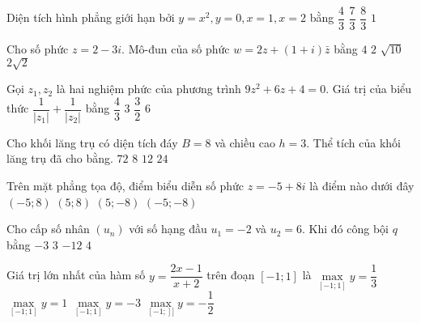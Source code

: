 \begin{ex}%
Diện tích hình phẳng giới hạn bởi $y=x^2, y=0, x=1, x=2$ bằng
\choice
{$\dfrac{4}{3}$}
{\True $\dfrac{7}{3}$}
{$\dfrac{8}{3}$}
{$1$}

\end{ex}
\begin{ex}%
Cho số phức $z=2-3 i$. Mô-đun của số phức $w=2 z+(1+i) \bar{z}$ bằng
\choice
{$4$}
{$2$}
{\True $\sqrt{10}$}
{$2\sqrt{2}$}

\end{ex}
\begin{ex}%
Gọi $z_1, z_2$ là hai nghiệm phức của phương trình $9 z^2+6 z+4=0$. Giá trị của biểu thức $\dfrac{1}{\left|z_1\right|}+\dfrac{1}{\left|z_2\right|}$ bằng
\choice
{$\dfrac{4}{3}$}
{\True $3$}
{$\dfrac{3}{2}$}
{$6$}

\end{ex}
\begin{ex}%
Cho khối lăng trụ có diện tích đáy $B=8$ và chiều cao $h=3$. Thể tích của khối lăng trụ đã cho bằng.
\choice
{$72$}
{$8$}
{$12$}
{\True $24$}

\end{ex}
\begin{ex}%
Trên mặt phẳng tọa độ, điểm biểu diễn số phức $z=-5+8 i$ là điểm nào dưới đây
\choice
{\True $(-5; 8)$}
{$(5; 8)$}
{$(5;-8)$}
{$(-5;-8)$}

\end{ex}
\begin{ex}%
Cho cấp số nhân $\left(u_n\right)$ với số hạng đầu $u_1=-2$ và $u_2=6$. Khi đó công bội $q$ bằng
\choice
{\True $-3$}
{$3$}
{$-12$}
{$4$}

\end{ex}
\begin{ex}%
Giá trị lớn nhất của hàm số $y=\dfrac{2 x-1}{x+2}$ trên đoạn $[-1; 1]$ là
\choice
{\True $\max\limits_{[-1; 1]} y=\dfrac{1}{3}$}
{$\max\limits_{[-1; 1]} y=1$}
{$\max\limits_{[-1; 1]} y=-3$}
{$\max\limits_{[-1;]]} y=-\dfrac{1}{2}$}

\end{ex}
